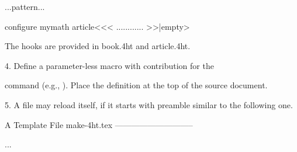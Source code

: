{{{{\begin{tabular / array}{...pattern...}
\begin{...}
        \<configure mymath article\><<<
         {...}{...}{...}{...}
        >>|empty>

        The hooks are provided in book.4ht and article.4ht.

4. Define a parameter-less macro \MAKETITLE with contribution for
   the \maketitle command (e.g., \def\MAKETITLE{\title{my name}}). Place
   the definition at the top of the source document.

5. A file may reload itself, if it starts with preamble similar to
   the following one.

               \ifx \HTML\UnDef
                  \def\HTML{...}
                  \def\CONFIG{\jobname}
                  \def\MAKETITLE{\author{...}}
                  \def\next{   \endinput}
                  \expandafter\next
               \fi


A Template File make-4ht.tex 
-----------------------------

%
%
%
%
%
%
%
%
%
%

\ifx \HTML\UnDef
   \def\HTML{sample,example}                     %
   \def\CONFIG{\jobname}
   \def\MAKETITLE{\title{my title}%
        \author{my name}}                        %
   \def\next{  \endinput}
   \expandafter\next
\fi


\end{...}
\end{tabular / array}}}}}
